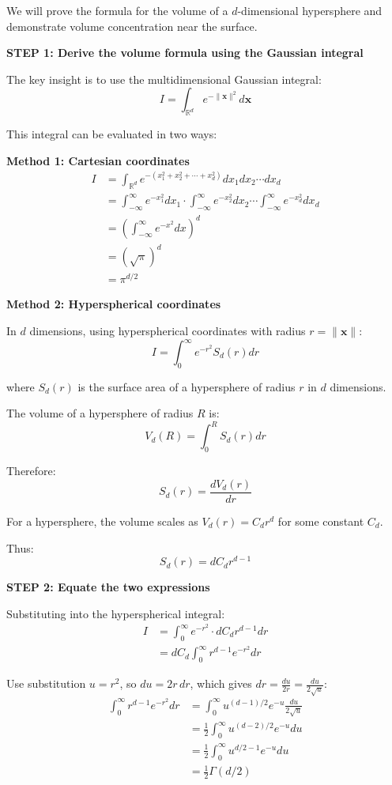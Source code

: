 \documentclass[12pt]{article}
\begin{document}
\begin{solution}
We will prove the formula for the volume of a \(d\)-dimensional hypersphere and demonstrate volume concentration near the surface.

\textbf{STEP 1: Derive the volume formula using the Gaussian integral}

The key insight is to use the multidimensional Gaussian integral:
\[
I = \int_{\mathbb{R}^d} e^{-\|\mathbf{x}\|^2} d\mathbf{x}
\]

This integral can be evaluated in two ways:

\textbf{Method 1: Cartesian coordinates}
\begin{align*}
I &= \int_{\mathbb{R}^d} e^{-(x_1^2 + x_2^2 + \cdots + x_d^2)} dx_1 dx_2 \cdots dx_d \\
&= \int_{-\infty}^{\infty} e^{-x_1^2} dx_1 \cdot \int_{-\infty}^{\infty} e^{-x_2^2} dx_2 \cdots \int_{-\infty}^{\infty} e^{-x_d^2} dx_d \\
&= \left(\int_{-\infty}^{\infty} e^{-x^2} dx\right)^d \\
&= (\sqrt{\pi})^d \\
&= \pi^{d/2}
\end{align*}

\textbf{Method 2: Hyperspherical coordinates}

In \(d\) dimensions, using hyperspherical coordinates with radius \(r = \|\mathbf{x}\|\):
\[
I = \int_0^{\infty} e^{-r^2} S_d(r) dr
\]

where \(S_d(r)\) is the surface area of a hypersphere of radius \(r\) in \(d\) dimensions.

The volume of a hypersphere of radius \(R\) is:
\[
V_d(R) = \int_0^R S_d(r) dr
\]

Therefore:
\[
S_d(r) = \frac{dV_d(r)}{dr}
\]

For a hypersphere, the volume scales as \(V_d(r) = C_d r^d\) for some constant \(C_d\).

Thus:
\[
S_d(r) = d C_d r^{d-1}
\]

\textbf{STEP 2: Equate the two expressions}

Substituting into the hyperspherical integral:
\begin{align*}
I &= \int_0^{\infty} e^{-r^2} \cdot d C_d r^{d-1} dr \\
&= d C_d \int_0^{\infty} r^{d-1} e^{-r^2} dr
\end{align*}

Use substitution \(u = r^2\), so \(du = 2r \, dr\), which gives \(dr = \frac{du}{2r} = \frac{du}{2\sqrt{u}}\):
\begin{align*}
\int_0^{\infty} r^{d-1} e^{-r^2} dr &= \int_0^{\infty} u^{(d-1)/2} e^{-u} \frac{du}{2\sqrt{u}} \\
&= \frac{1}{2} \int_0^{\infty} u^{(d-2)/2} e^{-u} du \\
&= \frac{1}{2} \int_0^{\infty} u^{d/2 - 1} e^{-u} du \\
&= \frac{1}{2} \Gamma(d/2)
\end{align*}


\end{solution}
\end{document}
